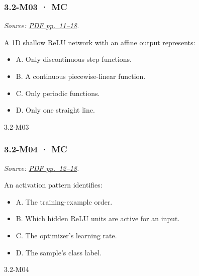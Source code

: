 \noindent\begin{minipage}{\linewidth}

\subsubsection{3.2-M03 · MC}\label{m03-mc-8}

\emph{Source:
\href{../Lecture\%20Slides/3.2.\%20Shallow\%20NN.pdf\#page=11}{PDF
pp.~11--18}.}

A 1D shallow ReLU network with an affine output represents:

\begin{itemize}
\tightlist
\item
  A. Only discontinuous step functions.
\item
  B. A continuous piecewise-linear function.
\item
  C. Only periodic functions.
\item
  D. Only one straight line.
\end{itemize}

\begin{solution}[8mm]{3.2-M03}

\end{solution}
\end{minipage}\par\medskip

\noindent\begin{minipage}{\linewidth}

\subsubsection{3.2-M04 · MC}\label{m04-mc-8}

\emph{Source:
\href{../Lecture\%20Slides/3.2.\%20Shallow\%20NN.pdf\#page=12}{PDF
pp.~12--18}.}

An activation pattern identifies:

\begin{itemize}
\tightlist
\item
  A. The training-example order.
\item
  B. Which hidden ReLU units are active for an input.
\item
  C. The optimizer's learning rate.
\item
  D. The sample's class label.
\end{itemize}

\begin{solution}[8mm]{3.2-M04}

\end{solution}
\end{minipage}\par\medskip

